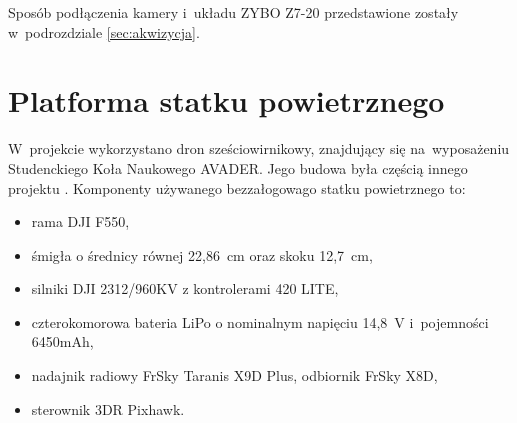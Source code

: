 
Sposób podłączenia kamery i~układu ZYBO Z7-20 przedstawione zostały w~podrozdziale \ref{sec:akwizycja}.

\section{Platforma statku powietrznego}
\label{sec:platforma_statku_powietrznego}

W~projekcie wykorzystano dron sześciowirnikowy, znajdujący się na~wyposażeniu Studenckiego Koła Naukowego AVADER. 
Jego budowa była częścią innego projektu \cite{mgr}. 
Komponenty używanego bezzałogowago statku powietrznego to:
\begin{itemize}
	\item rama DJI F550,
	\item śmigła o średnicy równej 22,86~cm oraz skoku 12,7~cm,
	\item silniki DJI 2312/960KV z kontrolerami 420 LITE,
	\item czterokomorowa bateria LiPo o nominalnym napięciu 14,8~V i~pojemności 6450mAh, 
	\item nadajnik radiowy FrSky Taranis X9D Plus, odbiornik FrSky X8D,
	\item sterownik 3DR Pixhawk.
\end{itemize}

